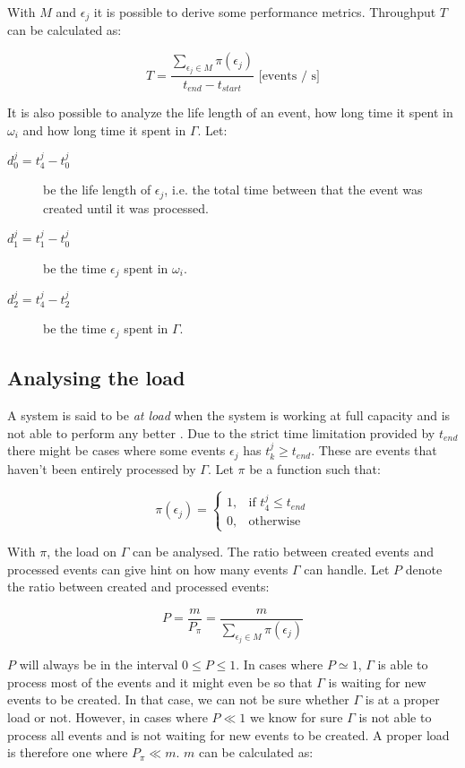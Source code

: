 With $M$ and $\epsilon_j$ it is possible to derive some performance metrics.
Throughput $T$ can be calculated as:

$$
T = \frac{\sum_{\epsilon_j \in M}{\pi(\epsilon_j)}}{t_{end} - t_{start}}
\text{ [events / s]}
$$

It is also possible to analyze the life length of an event, how long time it
spent in $\omega_i$ and how long time it spent in $\Gamma$. Let:

\begin{description}
    \item[$d_0^j = t_4^j - t_0^j$] be the life length of $\epsilon_j$, i.e. the
        total time between that the event was created until it was processed.
    \item[$d_1^j = t_1^j - t_0^j$] be the time $\epsilon_j$ spent in
        $\omega_i$.
    \item[$d_2^j = t_4^j - t_2^j$] be the time $\epsilon_j$ spent in
        $\Gamma$.
\end{description}

\subsection{Analysing the load}

A system is said to be \textit{at load} when the system is working at full
capacity and is not able to perform any better . Due to the
strict time limitation provided by $t_{end}$ there might be cases where some
events $\epsilon_j$ has $t_k^j \geq t_{end}$. These are events that haven't
been entirely processed by $\Gamma$. Let $\pi$ be a function such that:

\[
    \pi(\epsilon_j) =
\begin{cases}
    1, & \text{if } t_4^j \leq t_{end} \\
    0, & \text{otherwise}
\end{cases}
\]

With $\pi$, the load on $\Gamma$ can be analysed. The ratio between created
events and processed events can give hint on how many events $\Gamma$ can
handle. Let $P$ denote the ratio between created and processed events:

$$
P = \frac{m}{P_\pi} = \frac{m}{\sum_{\epsilon_j \in M}{\pi(\epsilon_j)}}
$$

$P$ will always be in the interval $0 \leq P \leq 1$. In cases where $P \simeq
1$, $\Gamma$ is able to process most of the events and it might even be so that
$\Gamma$ is waiting for new events to be created. In that case, we can not be
sure whether $\Gamma$ is at a proper load or not. However, in cases where $P
\ll 1$ we know for sure $\Gamma$ is not able to process all events and is not
waiting for new events to be created. A proper load is therefore one where
$P_\pi \ll m$. $m$ can be calculated as:

